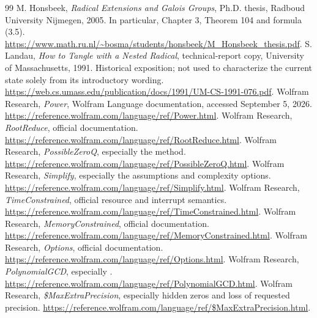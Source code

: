 \documentclass[11pt,letterpaper]{article}
\numberwithin{equation}{section}
\theoremstyle{definition}\newtheorem{definition}[theorem]{Definition}
\theoremstyle{remark}\newtheorem{remark}[theorem]{Remark}
\newcommand{\code}[1]{\texttt{\detokenize{#1}}}
\begin{document}
\begin{thebibliography}{99}
 M. Honsbeek, \emph{Radical Extensions and Galois Groups}, Ph.D. thesis, Radboud University Nijmegen, 2005. In particular, Chapter 3, Theorem 104 and formula (3.5). \url{https://www.math.ru.nl/~bosma/students/honsbeek/M_Honsbeek_thesis.pdf}.
 S. Landau, \emph{How to Tangle with a Nested Radical}, technical-report copy, University of Massachusetts, 1991. Historical exposition; not used to characterize the current state solely from its introductory wording. \url{https://web.cs.umass.edu/publication/docs/1991/UM-CS-1991-076.pdf}.
 Wolfram Research, \emph{Power}, Wolfram Language documentation, accessed September 5, 2026. \url{https://reference.wolfram.com/language/ref/Power.html}.
 Wolfram Research, \emph{RootReduce}, official documentation. \url{https://reference.wolfram.com/language/ref/RootReduce.html}.
 Wolfram Research, \emph{PossibleZeroQ}, especially the \code{"ExactAlgebraics"} method. \url{https://reference.wolfram.com/language/ref/PossibleZeroQ.html}.
 Wolfram Research, \emph{Simplify}, especially the assumptions and complexity options. \url{https://reference.wolfram.com/language/ref/Simplify.html}.
 Wolfram Research, \emph{TimeConstrained}, official resource and interrupt semantics. \url{https://reference.wolfram.com/language/ref/TimeConstrained.html}.
 Wolfram Research, \emph{MemoryConstrained}, official documentation. \url{https://reference.wolfram.com/language/ref/MemoryConstrained.html}.
 Wolfram Research, \emph{Options}, official documentation. \url{https://reference.wolfram.com/language/ref/Options.html}.
 Wolfram Research, \emph{PolynomialGCD}, especially \code{Extension -> Automatic}. \url{https://reference.wolfram.com/language/ref/PolynomialGCD.html}.
 Wolfram Research, \emph{\$MaxExtraPrecision}, especially hidden zeros and loss of requested precision. \url{https://reference.wolfram.com/language/ref/\$MaxExtraPrecision.html}.
\end{thebibliography}
\end{document}
